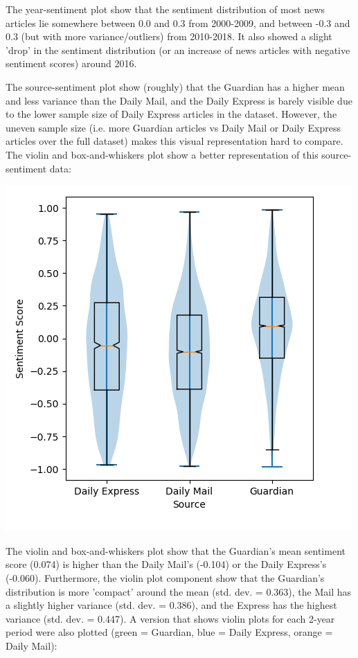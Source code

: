 \documentclass{report}
\begin{document}
The year-sentiment plot show that the sentiment distribution of most news articles lie somewhere between 0.0 and 0.3 from 2000-2009, and between -0.3 and 0.3 (but with more variance/outliers) from 2010-2018. 
It also showed a slight 'drop' in the sentiment distribution (or an increase of news articles with negative sentiment scores) around 2016.

The source-sentiment plot show (roughly) that the Guardian has a higher mean and less variance than the Daily Mail, and the Daily Express is barely visible due to the lower sample size of Daily Express articles in the dataset.
However, the uneven sample size (i.e. more Guardian articles vs Daily Mail or Daily Express articles over the full dataset) makes this visual representation hard to compare. The violin \cite{hintze1998violin} and box-and-whiskers plot \cite{tukey1977exploratory} show a better representation of this source-sentiment data:

\begin{center}
	\includegraphics[width=0.5\linewidth]{row-3-col-1.png}
\end{center}

The violin and box-and-whiskers plot show that the Guardian's mean sentiment score (0.074) is higher than the Daily Mail's (-0.104) or the Daily Express's (-0.060).
Furthermore, the violin plot component show that the Guardian's distribution is more 'compact' around the mean (std. dev. = 0.363), the Mail has a slightly higher variance (std. dev. = 0.386), and the Express has the highest variance (std. dev. = 0.447). A version that shows violin plots for each 2-year period were also plotted (green = Guardian, blue = Daily Express, orange = Daily Mail):
\end{document}
